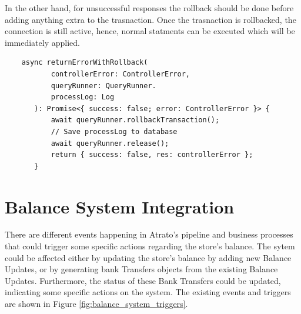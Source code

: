 In the other hand, for unsuccessful responses the rollback should be done before adding anything extra to the trasnaction.  Once the trasnaction is rollbacked, the connection is still active, hence, normal statments can be executed which will be immediately applied.

\begin{verbatim}
    async returnErrorWithRollback(
           controllerError: ControllerError,
           queryRunner: QueryRunner.
           processLog: Log
       ): Promise<{ success: false; error: ControllerError }> {
           await queryRunner.rollbackTransaction();
           // Save processLog to database
           await queryRunner.release();
           return { success: false, res: controllerError };
       }
    \end{verbatim}

\section{Balance System Integration}

There are different events happening in Atrato's pipeline and business processes that could trigger some specific actions regarding the store's balance. The sytem could be affected either by updating the store's balance by adding new Balance Updates, or by generating bank Transfers objects from the existing Balance Updates. Furthermore, the status of these Bank Transfers could be updated, indicating some specific actions on the system. The existing events and triggers are shown in Figure \ref{fig:balance_system_triggers}.

